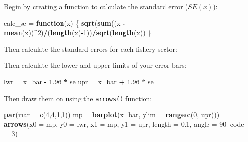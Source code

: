 \documentclass[]{book}
\newenvironment{Shaded}{\begin{snugshade}}{\end{snugshade}}
\newcommand{\ControlFlowTok}[1]{\textcolor[rgb]{0.13,0.29,0.53}{\textbf{#1}}}
\newcommand{\DataTypeTok}[1]{\textcolor[rgb]{0.13,0.29,0.53}{#1}}
\newcommand{\DecValTok}[1]{\textcolor[rgb]{0.00,0.00,0.81}{#1}}
\newcommand{\FloatTok}[1]{\textcolor[rgb]{0.00,0.00,0.81}{#1}}
\newcommand{\KeywordTok}[1]{\textcolor[rgb]{0.13,0.29,0.53}{\textbf{#1}}}
\newcommand{\NormalTok}[1]{#1}
\newcommand{\OperatorTok}[1]{\textcolor[rgb]{0.81,0.36,0.00}{\textbf{#1}}}
\newcommand{\StringTok}[1]{\textcolor[rgb]{0.31,0.60,0.02}{#1}}
\begin{document}
Begin by creating a function to calculate the standard error (\(SE(\bar{x})\)):

\begin{Shaded}
\begin{Highlighting}[]
\NormalTok{calc_se =}\StringTok{ }\ControlFlowTok{function}\NormalTok{(x) \{}
  \KeywordTok{sqrt}\NormalTok{(}\KeywordTok{sum}\NormalTok{((x }\OperatorTok{-}\StringTok{ }\KeywordTok{mean}\NormalTok{(x))}\OperatorTok{^}\DecValTok{2}\NormalTok{)}\OperatorTok{/}\NormalTok{(}\KeywordTok{length}\NormalTok{(x)}\OperatorTok{-}\DecValTok{1}\NormalTok{))}\OperatorTok{/}\KeywordTok{sqrt}\NormalTok{(}\KeywordTok{length}\NormalTok{(x))}
\NormalTok{\}}
\end{Highlighting}
\end{Shaded}

Then calculate the standard errors for each fishery sector:

\begin{Shaded}
\end{Shaded}

Then calculate the lower and upper limits of your error bars:

\begin{Shaded}
\begin{Highlighting}[]
\NormalTok{lwr =}\StringTok{ }\NormalTok{x_bar }\OperatorTok{-}\StringTok{ }\FloatTok{1.96} \OperatorTok{*}\StringTok{ }\NormalTok{se}
\NormalTok{upr =}\StringTok{ }\NormalTok{x_bar }\OperatorTok{+}\StringTok{ }\FloatTok{1.96} \OperatorTok{*}\StringTok{ }\NormalTok{se}
\end{Highlighting}
\end{Shaded}

Then draw them on using the \texttt{arrows()} function:

\begin{Shaded}
\begin{Highlighting}[]
\KeywordTok{par}\NormalTok{(}\DataTypeTok{mar =} \KeywordTok{c}\NormalTok{(}\DecValTok{4}\NormalTok{,}\DecValTok{4}\NormalTok{,}\DecValTok{1}\NormalTok{,}\DecValTok{1}\NormalTok{))}
\NormalTok{mp =}\StringTok{ }\KeywordTok{barplot}\NormalTok{(x_bar, }\DataTypeTok{ylim =} \KeywordTok{range}\NormalTok{(}\KeywordTok{c}\NormalTok{(}\DecValTok{0}\NormalTok{, upr)))}
\KeywordTok{arrows}\NormalTok{(}\DataTypeTok{x0 =}\NormalTok{ mp, }\DataTypeTok{y0 =}\NormalTok{ lwr, }\DataTypeTok{x1 =}\NormalTok{ mp, }\DataTypeTok{y1 =}\NormalTok{ upr, }\DataTypeTok{length =} \FloatTok{0.1}\NormalTok{, }\DataTypeTok{angle =} \DecValTok{90}\NormalTok{, }\DataTypeTok{code =} \DecValTok{3}\NormalTok{)}
\end{Highlighting}
\end{Shaded}
\end{document}
